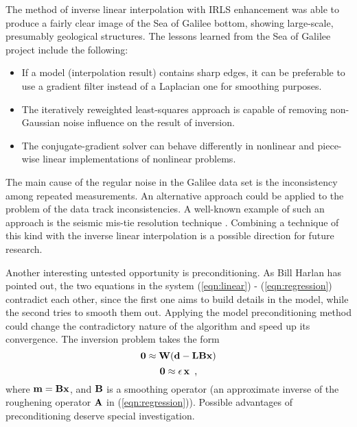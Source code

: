 The method of inverse linear interpolation with IRLS enhancement was able to
produce a fairly clear image of the Sea of Galilee bottom, showing large-scale,
presumably geological structures. The lessons learned from the
Sea of Galilee project include the following:
\begin{itemize} 
\item If a model (interpolation result) contains sharp edges, it can
be preferable to use a gradient filter instead of a Laplacian one for
smoothing purposes. 
\item The iteratively
reweighted least-squares approach is capable of removing non-Gaussian noise
influence on the result of inversion. 
\item The conjugate-gradient solver can behave differently in nonlinear and piece-wise linear implementations of nonlinear problems.
\end{itemize} 
\par
The main cause of the regular noise in the Galilee data set is
the inconsistency among repeated measurements. An
alternative approach could be applied to the problem
of the data track inconsistencies. A well-known
example of such an approach is the seismic mis-tie resolution
technique \cite{GEO.56.11.18251830}. Combining a technique of this
kind with the
inverse  linear interpolation is a possible direction for 
future research.  
\par
Another interesting
untested opportunity is preconditioning. As Bill Harlan has pointed out, 
the two equations in the system (\ref{eqn:linear}) - (\ref{eqn:regression})
contradict each other,  
since the first one aims to build details in the model, while
the second tries to smooth them out. Applying the model
preconditioning method could change the contradictory 
nature of the algorithm and speed up its convergence. 
The inversion problem takes the form
\begin{equation} {\bf 0 \approx W (d - LBx)} \label{eqn:precon}
\end{equation}
\begin{equation} {\bf 0 \approx \epsilon \, x} \,\,\,,\label{eqn:nograd} 
\end{equation}
where ${\bf m=Bx}$, and ${\bf B}$ is a smoothing operator (an approximate
inverse of the  roughening operator ${\bf A}$ in (\ref{eqn:regression})). 
Possible advantages of preconditioning 
deserve special investigation.













